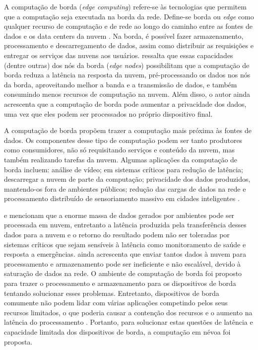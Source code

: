 
A computação de borda (\emph{edge computing}) refere-se às
tecnologias que permitem que a computação seja executada na borda da rede.
Define-se borda ou \emph{edge} como qualquer recurso de computação e de rede ao
longo do caminho entre as fontes de dados e os data centers da nuvem
\cite{Shi2016}.
Na borda, é possível fazer armazenamento, processamento e descarregamento de
dados, assim como distribuir as requisições e entregar os serviços das nuvens
aos usuários.
 ressalta que essas capacidades (dentre outras) dos nós da
borda (\emph{edge nodes}) possibilitam que a computação de borda reduza a
latência na resposta da nuvem, pré-processando os dados nos nós da borda,
aproveitando melhor a banda e a transmissão de dados, e também consumindo menos
recursos de computação na nuvem.
Além disso, o autor ainda acrescenta que a computação de borda pode aumentar a
privacidade dos dados, uma vez que eles podem ser processados no próprio
dispositivo final.

A computação de borda propõem trazer a computação mais próxima às fontes de
dados.
Os componentes desse tipo de computação podem ser
tanto produtores como consumidores, não só requisitando serviços e conteúdo da
nuvem, mas também realizando tarefas da nuvem.
Algumas aplicações da computação de borda incluem: análise de vídeo;
em sistemas críticos para redução de latência;
descarregar a nuvem de parte da computação;
privacidade dos dados produzidos, mantendo-os fora de ambientes públicos;
redução das cargas de dados na rede e
processamento distribuído de sensoriamento massivo em cidades inteligentes \cite{Shi2016}.


 e 
mencionam que a enorme massa de dados gerados por ambientes \iot pode ser
processada em nuvem, entretanto a latência produzida pela transferência desses
dados para a nuvem e o retorno do resultado podem não ser toleradas por sistemas
críticos que sejam sensíveis à latência como monitoramento de saúde e resposta a
emergências.
 ainda acrescenta que enviar tantos
dados à nuvem
para processamento e armazenamento pode ser ineficiente e não escalável, devido à
saturação de dados na rede.
O ambiente de computação de borda foi proposto para trazer o
processamento e armazenamento para os dispositivos de borda tentando solucionar
esses problemas.
Entretanto, dispositivos de borda comumente não podem lidar com várias
aplicações \iot competindo pelos seus recursos limitados, o que poderia causar a
contenção dos recursos e o aumento na latência do processamento
\cite{Dastjerdi2016}. Portanto, para solucionar estas questões de latência e
capacidade limitada dos dispositivos de borda, a computação em névoa foi proposta.


